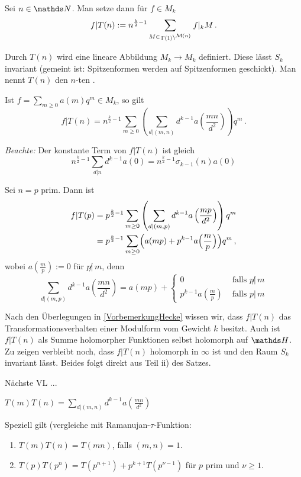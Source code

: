 \begin{defi}
Sei $n \in \NN$. Man setze dann für $f \in M_k$
\[
f | T(n) := n^{\frac k2 - 1} \sum_{M \in \linksmodulo{\Gamma(1)}{\mathcal M (n)}} f |_k M
\,.
\]
\end{defi}

\begin{satz-list}
\item Durch $T(n)$ wird eine lineare Abbildung $M_k \to M_k$ definiert. Diese lässt $S_k$ invariant (gemeint ist: Spitzenformen werden auf Spitzenformen geschickt). Man nennt $T(n)$ den $n$-ten .
\item Ist $f = \sum_{m \geq 0} a(m) q^m \in M_k$, so gilt
\[
f | T(n) = n^{\frac k2 - 1} \sum_{m \geq 0} \left( \sum_{d | (m,n)} d^{k-1} a\left(\frac{mn}{d^2}\right) \right) q^m
\,.
\]
\end{satz-list}

\emph{Beachte:} Der konstante Term von $f | T(n)$ ist gleich
\[
n^{\frac k2 - 1} \sum_{d|n} d^{k-1} a(0) = n^{\frac k2 - 1} \sigma_{k-1}(n) a(0)
\]

\begin{bsp}
Sei $n = p$ prim. Dann ist
\begin{align*}
f | T(p) &= p^{\frac k2 - 1} \sum_{m \geq 0} \left( \sum_{d | (m,p)} d^{k-1} a\left(\frac{mp}{d^2}\right) \right) q^m\\
&= p^{\frac k2 - 1} \sum_{m \geq 0} \Bigl( a(mp) + p^{k-1} a\Bigl( \frac mp\Bigr) \Bigr) q^m
\,,
\end{align*}
wobei $a\left(\frac mp\right) := 0$ für $p \!\! \not | \, m$, denn
\[
\sum_{d | (m,p)} d^{k-1} a \left( \frac {mn}{d^2} \right) = a(mp) + 
\begin{cases}
0 & \text{ falls } p \!\! \not | \, m\\ 
p^{k-1} a \left(\frac mp \right) & \text{ falls } p | \, m
\end{cases}
\]
\end{bsp}

\begin{bewe-list}
\item Nach den Überlegungen in \ref{VorbemerkungHecke} wissen wir, dass $f | T(n)$ das Transformationsverhalten einer Modulform vom Gewicht $k$ besitzt. Auch ist $f | T(n)$ als Summe holomorpher Funktionen selbst holomorph auf $\HH$. Zu zeigen verbleibt noch, dass $f | T(n)$ holomorph in $\infty$ ist und den Raum $S_k$ invariant lässt. Beides folgt direkt aus Teil ii) des Satzes.
\item Nächste VL ...
\end{bewe-list}

\begin{satz-list}
\item $T(m) T(n) = \sum_{d | (m,n)} d^{k-1} a \left( \frac {mn}{d^2} \right)$
\end{satz-list}

Speziell gilt (vergleiche mit Ramanujan-$\tau$-Funktion: \begin{enumerate}
\item $T(m) T(n) = T(mn)$, falls $(m,n) = 1$.
\item $T(p) T(p^n) = T(p^{n+1}) + p^{k+1} T(p^{\nu-1})$ für $p$ prim und $\nu \geq 1$.
\end{enumerate}
